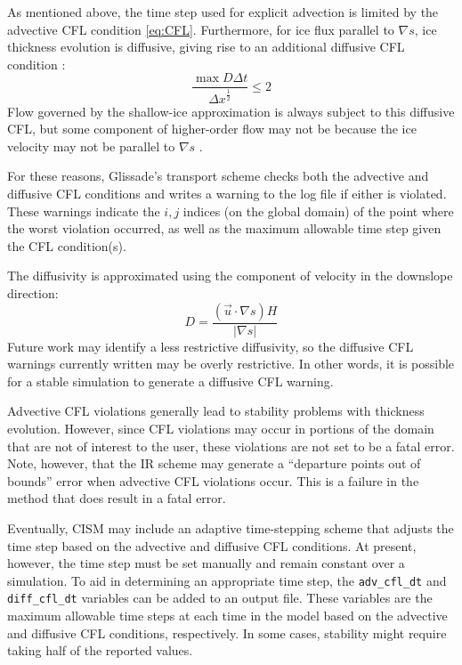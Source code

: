 As mentioned above, the time step used for explicit advection is limited by the
advective CFL condition \eqref{eq:CFL}.  
Furthermore, for ice flux parallel to $\nabla s$, ice thickness evolution is diffusive,
giving rise to an additional diffusive CFL condition \citep{Bueler:2009ee}:
\begin{equation}
    \frac{\max D \Delta t} { {\Delta x}^\frac{1}{2}} \leq 2 
\end{equation}
Flow governed by the shallow-ice approximation is always subject to this diffusive CFL,
but some component of higher-order flow may not be because the ice
velocity may not be parallel to $\nabla s$ \citep{Bueler:2009ee}.

For these reasons, Glissade's transport scheme checks both the
advective and diffusive CFL conditions and writes a warning to the log file if
either is violated.  These warnings indicate the $i,j$ indices (on the global domain)
of the point where the worst violation occurred, as well as the maximum allowable time step
given the CFL condition(s).

The diffusivity is approximated using the component of velocity in the downslope
direction:
\begin{equation}
  D = \frac{(\vec{u} \cdot \nabla s) H}{|\nabla s|}
\end{equation}
Future work may identify a less restrictive diffusivity, so the diffusive CFL 
warnings currently written may be overly restrictive.  In other words, it is possible
for a stable simulation to generate a diffusive CFL warning.  

Advective CFL violations generally lead to stability problems with 
thickness evolution.  However, since CFL violations may occur in portions of the
domain that are not of interest to the user, these violations are not set to be
a fatal error.  Note, however, that the IR scheme may generate
a ``departure points out of bounds'' error when advective CFL violations occur.
This is a failure in the method that does result in a fatal error.

Eventually, CISM may include an adaptive time-stepping scheme that adjusts the 
time step based on the advective and diffusive CFL conditions.
At present, however, the time step must be set manually and remain constant over a simulation.
To aid in determining an appropriate time step, the \texttt{adv\_cfl\_dt}
and \texttt{diff\_cfl\_dt} variables can be added to an output file.  These variables
are the maximum allowable time steps at each time in the model based on the 
advective and diffusive CFL conditions, respectively.  In some cases,
stability might require taking half of the reported values.



